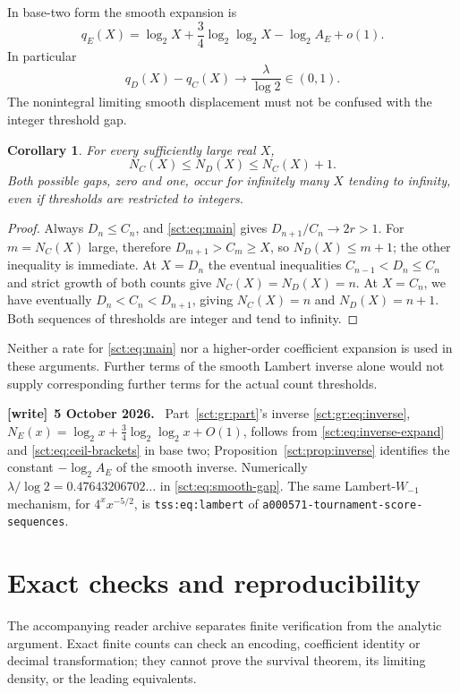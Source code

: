 \documentclass[11pt,letterpaper]{article}
\newcommand{\file}[1]{\nolinkurl{#1}}
\newtheorem{corollary}[theorem]{Corollary}
\theoremstyle{definition}\newtheorem{remark}[theorem]{Remark}
\newenvironment{writenote}[1][]{\par\smallskip\begingroup\small
 \noindent\textbf{[write]}\if\relax\detokenize{#1}\relax\else~\textbf{#1.}\fi\ }%
 {\par\endgroup\smallskip}
\begin{document}
In base-two form the smooth expansion is
\[
 q_E(X)=\log_2X+\frac34\log_2\log_2X-\log_2A_E+o(1).
\]
In particular
\begin{equation}\label{sct:eq:smooth-gap}
 q_D(X)-q_C(X)\longrightarrow\frac\lambda{\log2}\in(0,1).
\end{equation}
The nonintegral limiting smooth displacement must not be confused with the
integer threshold gap.

\begin{corollary}\label{sct:cor:gap}
For every sufficiently large real $X$,
\begin{equation}\label{sct:eq:threshold-gap}
 N_C(X)\le N_D(X)\le N_C(X)+1.
\end{equation}
Both possible gaps, zero and one, occur for infinitely many $X$ tending to
infinity, even if thresholds are restricted to integers.
\end{corollary}
\begin{proof}
Always $D_n\le C_n$, and \eqref{sct:eq:main} gives
$D_{n+1}/C_n\to2r>1$. For $m=N_C(X)$ large, therefore
$D_{m+1}>C_m\ge X$, so $N_D(X)\le m+1$; the other inequality is immediate.
At $X=D_n$ the eventual inequalities
$C_{n-1}<D_n\le C_n$ and strict growth of both counts give
$N_C(X)=N_D(X)=n$. At $X=C_n$, we have eventually
$D_n<C_n<D_{n+1}$, giving $N_C(X)=n$ and $N_D(X)=n+1$.
Both sequences of thresholds are integer and tend to infinity.
\end{proof}
Neither a rate for \eqref{sct:eq:main} nor a higher-order coefficient expansion is
used in these arguments. Further terms of the smooth Lambert inverse alone
would not supply corresponding further terms for the actual count thresholds.
\begin{writenote}[5 October 2026]
Part~\ref{sct:gr:part}'s inverse \eqref{sct:gr:eq:inverse}, $N_E(x)=\log_2x+\frac34\log_2\log_2x+O(1)$, follows from \eqref{sct:eq:inverse-expand} and \eqref{sct:eq:ceil-brackets} in base two; Proposition~\ref{sct:prop:inverse} identifies the constant $-\log_2A_E$ of the smooth inverse. Numerically $\lambda/\log2=0.47643206702\ldots$ in \eqref{sct:eq:smooth-gap}. The same Lambert-$W_{-1}$ mechanism, for $4^xx^{-5/2}$, is \texttt{tss:eq:lambert} of \file{a000571-tournament-score-sequences}.
\end{writenote}

\section{Exact checks and reproducibility}\label{sct:sec:checks}
The accompanying reader archive separates finite verification from the
analytic argument. Exact finite counts can check an encoding, coefficient
identity or decimal transformation; they cannot prove the survival theorem,
its limiting density, or the leading equivalents.
\end{document}
